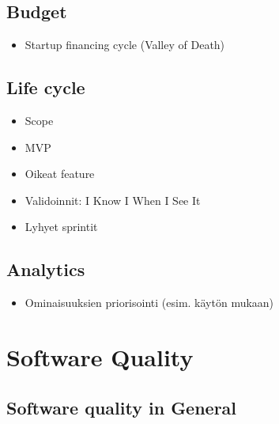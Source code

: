 ﻿\documentclass[12pt,a4paper,finnish]{tutthesis}
\begin{document}
 \section{Budget}




 \begin{itemize}
  \item Startup financing cycle (Valley of Death)
 \end{itemize}
 
 \section{Life cycle}




 \begin{itemize}
 
 \item Scope
 \item MVP
 \item Oikeat feature
 \item Validoinnit: I Know I When I See It
 \item Lyhyet sprintit
 
 \end{itemize}
 
 \section{Analytics}
 
 \begin{itemize}
 
 \item Ominaisuuksien priorisointi (esim. käytön mukaan)
 
 \end{itemize}
  
 \chapter{Software Quality}
 
 \section{Software quality in General}
 
\end{document}
